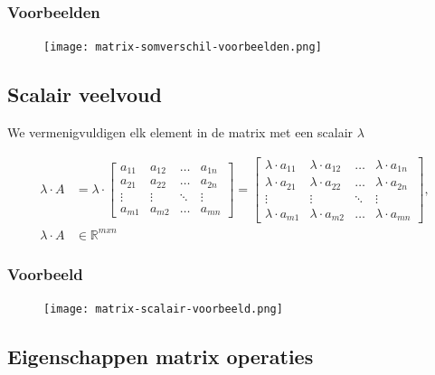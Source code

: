\documentclass{article}
\begin{document}
\subsubsection{Voorbeelden}

\begin{figure}[H]
    \centering
    \texttt{[image: matrix-somverschil-voorbeelden.png]}
\end{figure}

\subsection{Scalair veelvoud}

We vermenigvuldigen elk element in de matrix met een scalair $\lambda$

\begin{align*}
\lambda \cdot A & = \lambda \cdot 
\begin{bmatrix}
    a_{11} & a_{12} & \dots & a_{1n}\\
    a_{21} & a_{22} & \dots & a_{2n}\\
    \vdots & \vdots & \ddots & \vdots\\
    a_{m1} & a_{m2} & \dots & a_{mn}
\end{bmatrix} =
\begin{bmatrix}
    \lambda\cdot a_{11} & \lambda\cdot a_{12} & \dots & \lambda\cdot a_{1n}\\
    \lambda\cdot a_{21} & \lambda\cdot a_{22} & \dots & \lambda\cdot a_{2n}\\
    \vdots & \vdots & \ddots & \vdots\\
    \lambda\cdot a_{m1} & \lambda\cdot a_{m2} & \dots & \lambda\cdot a_{mn}
\end{bmatrix}, \\
\lambda \cdot A & \in \mathbb{R}^{mxn}
\end{align*}

\subsubsection{Voorbeeld}

\begin{figure}[H]
    \centering
    \texttt{[image: matrix-scalair-voorbeeld.png]}
\end{figure}


\subsection{Eigenschappen matrix operaties}
\end{document}

